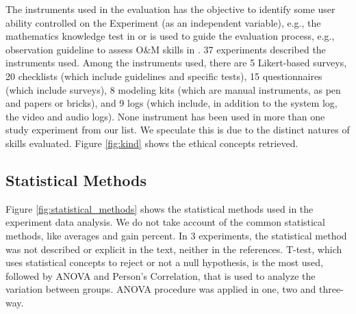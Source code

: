 The instruments used in the evaluation has the objective to identify some user ability controlled on the Experiment (as an independent variable), e.g., the mathematics knowledge test in  or is used to guide the evaluation process, e.g., observation guideline to assess O\&M skills in . 37 experiments described the instruments used. Among the instruments used, there are 5 Likert-based surveys, 20 checklists (which include guidelines and specific tests), 15 questionnaires (which include surveys), 8 modeling kits (which are manual instruments, as pen and papers or bricks), and 9 logs (which include, in addition to the system log, the video and audio logs). None instrument has been used in more than one study experiment from our list. We speculate this is due to the distinct natures of skills evaluated. Figure \ref{fig:kind} shows the ethical concepts retrieved.

	\begin{figure}[h] 

   	    \captionsetup{width=12cm}%
	\end{figure}

\subsection{Statistical Methods}
\label{subsec:results-statistical-methods}

Figure \ref{fig:statistical_methods} shows the statistical methods used in the experiment data analysis. We do not take account of the common statistical methods, like averages and gain percent. In 3 experiments, the statistical method was not described or explicit in the text, neither in the references. T-test, which uses statistical concepts to reject or not a null hypothesis, is the most used, followed by ANOVA and Person’s Correlation, that is used to analyze the variation between groups. ANOVA procedure was applied in one, two and three-way. 


